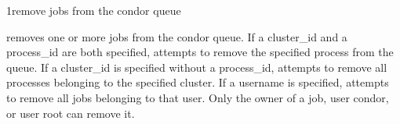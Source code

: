 \begin{ManPage}{}{1}{remove jobs from the condor queue}
\label{man-condor-rm}
\Synopsis {}

\Description
{} removes one or more jobs from the condor queue. If a cluster\_id and a process\_id are both specified,
 attempts to remove the specified process from the queue. If a cluster\_id is specified without a process\_id,
 attempts to remove all processes belonging to the specified cluster. If a username is specified, 
attempts to remove all jobs belonging to that user. Only the owner of a job, user condor, or user root can remove it. 

\begin{Options}
\end{Options}

\end{ManPage}
